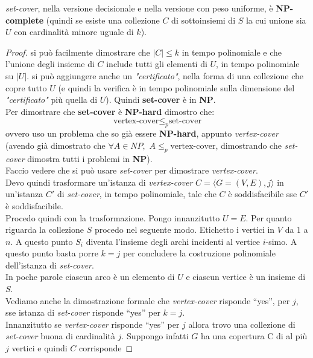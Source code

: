 \begin{teorema}
  \textit{set-cover}, nella versione decisionale e nella
  versione con peso uniforme, è \textbf{NP-complete} (quindi se esiste una
  collezione $C$ di sottoinsiemi di $S$ 
  la cui unione sia $U$ con cardinalità minore uguale di $k$).
\end{teorema}
\begin{proof}
  si può facilmente dimostrare che $|C|\leq k$ in tempo polinomiale e che
  l'unione degli insieme di $C$ include tutti gli elementi di $U$, in
  tempo polinomiale su $|U|$. si può aggiungere anche un \textit{"certificato"}, nella
  forma di una collezione che copre tutto $U$ (e quindi la verifica è in tempo
  polinomiale sulla dimensione del \textit{"certificato"} più quella di $U$). Quindi
  \textbf{set-cover} è in \textbf{NP}.\\
  Per dimostrare che \textbf{set-cover} è \textbf{NP-hard} dimostro che:
  \[\mbox{vertex-cover} \leq_p \mbox{set-cover}\]
  ovvero uso un problema che so già essere \textbf{NP-hard}, appunto
  \textit{vertex-cover} (avendo già dimostrato che $\forall A\in NP, \,\,A\leq_p
  \mbox{vertex-cover}$, dimostrando che \textit{set-cover} dimostra tutti i
  problemi in \textbf{NP}).\\
  Faccio vedere che si può usare \textit{set-cover} per dimostrare
  \textit{vertex-cover}.\\
  Devo quindi trasformare un'istanza di \textit{vertex-cover} $C=\langle
  G=(V,E), j\rangle$ in un'istanza $C'$ di \textit{set-cover}, in tempo
  polinomiale, tale che $C$ è soddisfacibile sse $C'$ è soddisfacibile.\\
  Procedo quindi con la trasformazione. Pongo innanzitutto $U=E$. Per quanto
  riguarda la collezione $S$ procedo nel seguente modo. Etichetto i vertici in
  $V$ da $1$ a $n$. A questo punto $S_i$ diventa l'insieme degli archi incidenti
  al vertice $i$-simo. A questo punto basta porre $k=j$ per concludere la
  costruzione polinomiale dell'istanza di \textit{set-cover}.\\
  In poche parole ciascun arco è un elemento di $U$ e ciascun vertice è un
  insieme di $S$.\\
  Vediamo anche la dimostrazione formale che \textit{vertex-cover} risponde
  ``yes'', per $j$, sse istanza di \textit{set-cover} risponde ``yes'' per
  $k=j$.\\
  Innanzitutto se \textit{vertex-cover} risponde ``yes'' per $j$ allora trovo
  una collezione di \textit{set-cover} buona di cardinalità $j$. Suppongo
  infatti $G$ ha una copertura C di al più $j$ vertici e quindi $C$ corrisponde

\end{proof}
